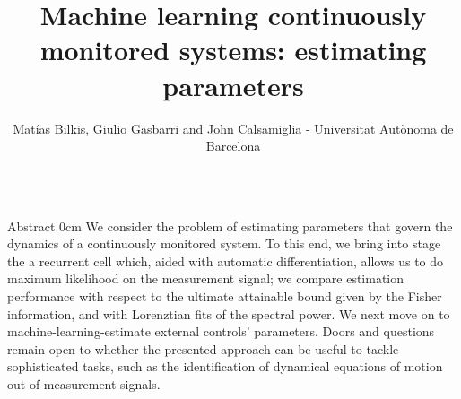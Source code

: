 \documentclass[xcolor={table}]{beamer}
\title{{\Large \textbf{Machine learning continuously monitored systems: estimating parameters}}}
\author{ {\normalsize Matías Bilkis, Giulio Gasbarri and John Calsamiglia  - Universitat Autònoma de Barcelona}}
\institute{}%
\begin{document}
\begin{frame}[fragile=singleslide,t]\centering

\maketitle

\begin{columns}[onlytextwidth,T]

\begin{column}{.47\textwidth}

\begin{block}{Abstract}
   0cm \dimexpr\linewidth-0cm\relax
  We consider the problem of estimating parameters that govern the dynamics of a continuously monitored system. To this end, we bring into stage the a recurrent cell which, aided with automatic differentiation, allows us to do maximum likelihood on the measurement signal; we compare estimation performance with respect to the ultimate attainable bound given by the Fisher information, and with Lorenztian fits of the spectral power. We next move on to machine-learning-estimate external controls' parameters. Doors and questions remain open to whether the presented approach can be useful to tackle sophisticated tasks, such as the identification of dynamical equations of motion out of measurement signals.
\end{block}


\end{column}
\end{columns}
\end{frame}
\end{document}
